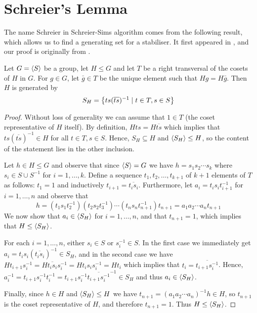 \section{Schreier's Lemma}
The name Schreier in Schreier-Sims algorithm comes from the following
result, which allows us to find a generating set for a stabiliser. It
first appeared in \cite{schreier27}, and our proof is originally from \cite{hall59}.
\begin{theorem}
Let $G = \left\langle S \right\rangle$ be a group, let $H \leq G$ and let $T$ be a right transversal of the cosets of $H$ in $G$. For $g \in G$, let $\bar{g} \in T$ be the unique element such that $Hg = H\bar{g}$. Then $H$ is generated by
\begin{equation}
S_H = \left\lbrace t s (\overline{ts})^{-1} \mid t \in T, s \in S \right\rbrace
\end{equation}
\end{theorem}
\begin{proof}
  Without loss of generality we can assume that $1 \in T$ (the coset
  representative of $H$ itself). By definition, $Hts = H\overline{ts}$
  which implies that $t s (\overline{ts})^{-1} \in H$ for all $t \in
  T, s \in S$. Hence, $S_H \subseteq H$ and $\left\langle S_H \right\rangle \leq H$, so the
  content of the statement lies in the other inclusion.
  
  Let $h \in H \leq G$ and observe that since $\left\langle S \right\rangle = G$ we have $h
  = s_1 s_2 \dotsm s_k$ where $s_i \in S \cup S^{-1}$ for $i = 1,
  \dotsc, k$. Define a sequence $t_1, t_2, \dotsc, t_{k + 1}$ of $k +
  1$ elements of $T$ as follows: $t_1 = 1$ and inductively $t_{i + 1} = \overline{t_i s_i}$. Furthermore, let $a_i = t_i s_i t_{i + 1}^{-1}$ for $i = 1, \dotsc, n$ and observe that
\begin{equation}
h = (t_1 s_1 t_2^{-1})(t_2 s_2 t_3^{-1}) \dotsm (t_n s_n t_{n + 1}^{-1}) t_{n + 1} = a_1 a_2 \dotsm a_n t_{n + 1}
\end{equation}
We now show that $a_i \in \left\langle S_H \right\rangle$ for $i = 1, \dotsc, n$, and that $t_{n + 1} = 1$, which
implies that $H \leq \left\langle S_H \right\rangle$. 

For each $i = 1, \dotsc, n$, either $s_i \in S$ or $s_i^{-1} \in S$.
In the first case we immediately get $a_i = t_i s_i (\overline{t_i
  s_i})^{-1} \in S_H$, and in the second case we have $H t_{i + 1}
s_i^{-1} = H \overline{t_i s_i} s_i^{-1} = H t_i s_i s_i^{-1} = H t_i$
which implies that $t_i = \overline{t_{i + 1} s_i^{-1}}$. Hence,
$a_i^{-1} = t_{i + 1} s_i^{-1} t_i^{-1} = t_{i + 1} s_i^{-1}
\overline{t_{i + 1} s_i^{-1}}^{-1} \in S_H$ and thus $a_i \in \left\langle S_H \right\rangle$.

Finally, since $h \in H$ and $\left\langle S_H \right\rangle \leq H$ we have $t_{n + 1} = (a_1 a_2 \dotsm a_n)^{-1} h \in H$, so $t_{n + 1}$ is the coset representative of $H$, and therefore $t_{n + 1} = 1$. Thus $H \leq \left\langle S_H \right\rangle$.
\end{proof}

